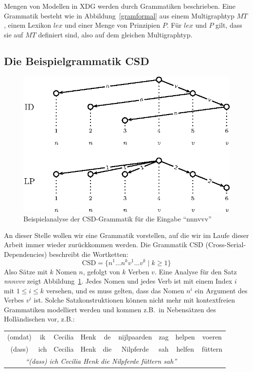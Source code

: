Mengen von Modellen in XDG werden durch Grammatiken beschrieben.  Eine
Grammatik besteht wie in Abbildung~\ref{gramformal} aus einem
Multigraphtyp $\mathit{MT}$, einem Lexikon $\mathit{lex}$ und einer
Menge von Prinzipien $P$. F\"ur $\mathit{lex}$ und $P$ gilt, dass sie
auf $\mathit{MT}$ definiert sind, also auf dem gleichen Multigraphtyp.

\subsection{Die Beispielgrammatik CSD}
\begin{figure}
\centering
\includegraphics[scale=1.0]{eps/nnnvvv.eps}
\caption{Beispielanalyse der CSD-Grammatik f\"ur die Eingabe ``nnnvvv''}
\label{csdanalyse}
\end{figure}
An dieser Stelle wollen wir eine Grammatik vorstellen, auf die wir im
Laufe dieser Arbeit immer wieder zur\"uckkommen werden.  Die Grammatik
CSD (Cross-Serial-Dependencies) beschreibt die Wortketten:
$$
\text{CSD} = \{n^{1} \ldots n^{k} v^{1} \ldots v^{k} \mid k \geq
1 \}
$$ Also S\"atze mit $k$ Nomen $n$, gefolgt von $k$ Verben $v$. Eine
Analyse f\"ur den Satz {\it nnnvvv} zeigt Abbildung~\ref{csdanalyse}. Jedes Nomen und
jedes Verb ist mit einem Index $i$ mit $1 \leq i \leq k$ versehen, und
es muss gelten, dass das Nomen $n^{i}$ ein Argument des Verbes $v^{i}$
ist. Solche Satzkonstruktionen k\"onnen nicht mehr mit kontextfreien
Grammatiken modelliert werden und kommen z.B.\ in Nebens\"atzen des
Holl\"andischen vor, z.B.:
\begin{center}
{\it
\begin{tabular}{c c c c c c c c c}
(omdat) & ik & Cecilia & Henk & de & nijlpaarden & zag & helpen &
voeren \\
(dass) & ich & Cecilia & Henk & die & Nilpferde & sah & helfen &
f\"uttern \\
\multicolumn{8}{c}{{\it``(dass) ich Cecilia Henk die Nilpferde f\"uttern sah''}}
\end{tabular}
}
 \end{center}

